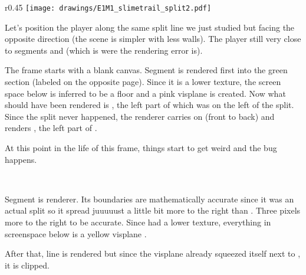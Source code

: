 \begin{minipage}{0.47\textwidth}
\end{minipage}
\hspace{4mm}
\begin{minipage}{0.47\textwidth}
\end{minipage} 
\par
\vspace{1mm}
\par



\par
\begin{wrapfigure}[23]{r}{0.45\textwidth}
\centering
\texttt{[image: drawings/E1M1\_slimetrail\_split2.pdf]}
\end{wrapfigure}
Let's position the player along the same split line we just studied but facing the opposite direction (the scene is simpler with less walls). The player still very close to segments  and  (which is were the rendering error is).\\
\par
The frame starts with a blank canvas. Segment  is rendered first into the green section (labeled  on the opposite page). Since it is a lower texture, the screen space below is inferred to be a floor and a pink visplane  is created. Now what should have been rendered is , the left part of  which was on the left of the split. Since the split never happened, the renderer carries on (front to back) and renders , the left part of .\\
\par
At this point in the life of this frame, things start to get weird and the bug happens.
 

\\
\par
Segment  is renderer. Its boundaries are mathematically accurate since it was an actual split so it spread juuuuust a little bit more to the right than  . Three pixels more to the right to be accurate. Since  had a lower texture, everything in screenspace below  is a yellow visplane .\\
 \par
 After that, line  is rendered but since the visplane already squeezed itself next to , it is clipped.\\
 \par
 
